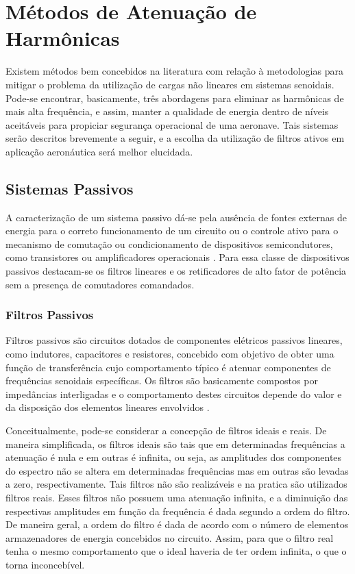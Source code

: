 \section{Métodos de Atenuação de Harmônicas}

Existem métodos bem concebidos na literatura com relação à metodologias para mitigar o problema da utilização de cargas não lineares em sistemas senoidais. Pode-se encontrar, basicamente, três abordagens para eliminar as harmônicas de mais alta frequência, e assim, manter a qualidade de energia dentro de níveis aceitáveis para propiciar segurança operacional de uma aeronave. Tais sistemas serão descritos brevemente a seguir, e a escolha da utilização de filtros ativos em aplicação aeronáutica será melhor elucidada.  

\subsection{Sistemas Passivos}

A caracterização de um sistema passivo dá-se pela ausência de fontes externas de energia para o correto funcionamento de um circuito ou o controle ativo para o mecanismo de comutação ou condicionamento de dispositivos semicondutores, como transistores ou amplificadores operacionais \cite{AN779}. Para essa classe de dispositivos passivos destacam-se os filtros lineares e os retificadores de alto fator de potência sem a presença de comutadores comandados. 

\subsubsection{Filtros Passivos}

Filtros passivos são circuitos dotados de componentes elétricos passivos lineares, como indutores, capacitores e resistores, concebido com objetivo de obter uma função de transferência cujo comportamento típico é atenuar componentes de frequências senoidais específicas. Os filtros são basicamente compostos por impedâncias interligadas e o comportamento destes circuitos depende do valor e da disposição dos elementos lineares envolvidos \cite{Mussoi2004,Kassick2010}. 

Conceitualmente, pode-se considerar a concepção de filtros ideais e reais. De maneira simplificada, os filtros ideais são tais que em determinadas frequências a atenuação é nula e em outras é infinita, ou seja, as amplitudes dos componentes do espectro não se altera em determinadas frequências mas em outras são levadas a zero, respectivamente. Tais filtros não são realizáveis e na pratica são utilizados filtros reais. Esses filtros não possuem uma atenuação infinita, e a diminuição das respectivas amplitudes em função da frequência é dada segundo a ordem do filtro. De maneira geral, a ordem do filtro é dada de acordo com o número de elementos armazenadores de energia concebidos no circuito. Assim, para que o filtro real tenha o mesmo comportamento que o ideal haveria de ter ordem infinita, o que o torna inconcebível. 


